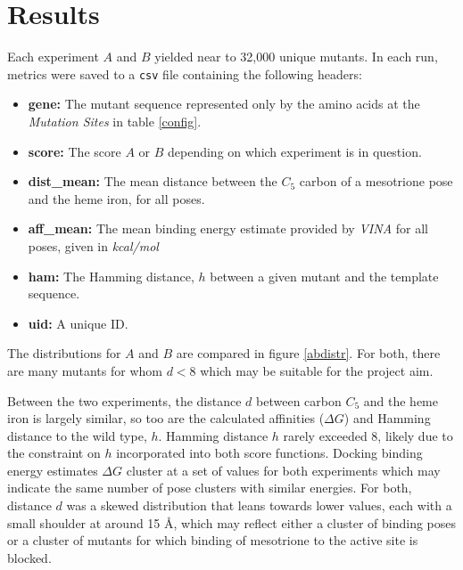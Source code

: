 \documentclass[16pt]{book}
\begin{document}
\section{Results}

Each experiment $A$ and $B$ yielded near to 32,000 unique mutants.
In each run, metrics were saved to a \texttt{csv} file containing the following headers:

\begin{itemize}
	\item \textbf{gene:} The mutant sequence represented only by the amino acids at the \textit{Mutation Sites} in table \ref{config}.
	\item \textbf{score:} The score $A$ or $B$ depending on which experiment is in question.
	\item \textbf{dist\_mean:} The mean distance between the $C_5$ carbon of a mesotrione pose and the heme iron, for all poses.
	\item \textbf{aff\_mean:} The mean binding energy estimate provided by \textit{VINA} for all poses, given in \textit{kcal/mol}
	\item \textbf{ham:} The Hamming distance, $h$ between a given mutant and the template sequence.
	\item \textbf{uid:} A unique ID.
\end{itemize}

The distributions for $A$ and $B$ are compared in figure \ref{abdistr}.
For both, there are many mutants for whom $d < 8$ which may be suitable for the project aim.

Between the two experiments, the distance $d$ between carbon $C_5$ and the heme iron is largely similar, so too are the calculated affinities ($\Delta G$) and Hamming distance to the wild type, $h$.
Hamming distance $h$ rarely exceeded 8, likely due to the constraint on $h$ incorporated into both score functions.
Docking binding energy estimates $\Delta G$ cluster at a set of values for both experiments which may indicate the same number of pose clusters with similar energies. 
For both, distance $d$ was a skewed distribution that leans towards lower values, each with a small shoulder at around 15 \AA, which may reflect either a cluster of binding poses or a cluster of mutants for which binding of mesotrione to the active site is blocked.
\end{document}
